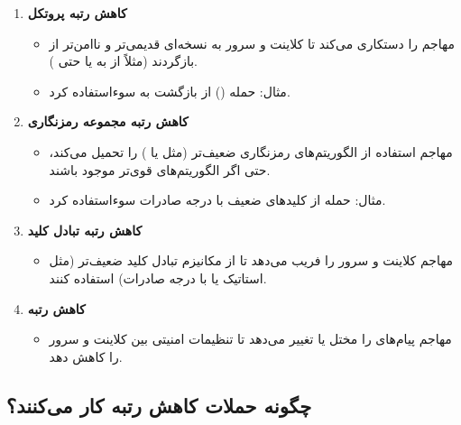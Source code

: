 \begin{enumerate}
    \item \textbf{کاهش رتبه پروتکل}
        \begin{itemize}
            \item مهاجم  را دستکاری می‌کند تا کلاینت و سرور به نسخه‌ای قدیمی‌تر و ناامن‌تر از  بازگردند (مثلاً از  به  یا حتی ).
            \item مثال: حمله  () از بازگشت به  سوءاستفاده کرد.
        \end{itemize}

    \item \textbf{کاهش رتبه مجموعه رمزنگاری }
        \begin{itemize}
            \item مهاجم استفاده از الگوریتم‌های رمزنگاری ضعیف‌تر (مثل  یا ) را تحمیل می‌کند، حتی اگر الگوریتم‌های قوی‌تر موجود باشند.
            \item مثال: حمله  از کلیدهای  ضعیف با درجه صادرات سوءاستفاده کرد.
        \end{itemize}

    \item \textbf{کاهش رتبه تبادل کلید}
        \begin{itemize}
            \item مهاجم کلاینت و سرور را فریب می‌دهد تا از مکانیزم تبادل کلید ضعیف‌تر (مثل  استاتیک یا  با درجه صادرات) استفاده کنند.
        \end{itemize}

    \item \textbf{کاهش رتبه }
        \begin{itemize}
            \item مهاجم پیام‌های  را مختل یا تغییر می‌دهد تا تنظیمات امنیتی بین کلاینت و سرور را کاهش دهد.
        \end{itemize}
\end{enumerate}

\subsection*{چگونه حملات کاهش رتبه کار می‌کنند؟}

